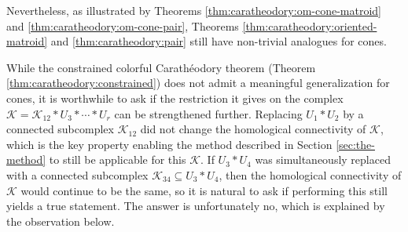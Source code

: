 \documentclass[a4paper,11pt,reqno, english]{amsart}
\theoremstyle{definition}
\theoremstyle{remark}
\begin{document}
Nevertheless, as illustrated by Theorems \ref{thm:caratheodory:om-cone-matroid} and \ref{thm:caratheodory:om-cone-pair}, Theorems \ref{thm:caratheodory:oriented-matroid} and \ref{thm:caratheodory:pair} still have non-trivial analogues for cones.

While the constrained colorful Carath\'eodory theorem (Theorem \ref{thm:caratheodory:constrained}) does not admit a meaningful generalization for cones, it is worthwhile to ask if the restriction it gives on the complex $\mathscr{K}=\mathscr{K}_{12}*U_3*\cdots*U_r$ can be strengthened further. Replacing $U_1*U_2$ by a connected subcomplex $\mathscr{K}_{12}$ did not change the homological connectivity of $\mathscr{K}$, which is the key property enabling the method described in Section \ref{sec:the-method} to still be applicable for this $\mathscr{K}$. If $U_3*U_4$ was simultaneously replaced with a connected subcomplex $\mathscr{K}_{34}\subseteq U_3*U_4$, then the homological connectivity of $\mathscr{K}$ would continue to be the same, so it is natural to ask if performing this still yields a true statement. The answer is unfortunately no, which is explained by the observation below.
\end{document}

